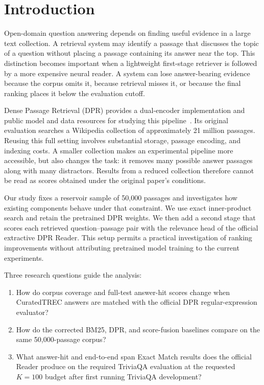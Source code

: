 \section{Introduction}
Open-domain question answering depends on finding useful evidence in a large text collection. A retrieval system may identify a passage that discusses the topic of a question without placing a passage containing its answer near the top. This distinction becomes important when a lightweight first-stage retriever is followed by a more expensive neural reader. A system can lose answer-bearing evidence because the corpus omits it, because retrieval misses it, or because the final ranking places it below the evaluation cutoff.

Dense Passage Retrieval (DPR) provides a dual-encoder implementation and public model and data resources for studying this pipeline~\cite{dpr,dprcode}. Its original evaluation searches a Wikipedia collection of approximately 21 million passages. Reusing this full setting involves substantial storage, passage encoding, and indexing costs. A smaller collection makes an experimental pipeline more accessible, but also changes the task: it removes many possible answer passages along with many distractors. Results from a reduced collection therefore cannot be read as scores obtained under the original paper's conditions.

Our study fixes a reservoir sample of 50,000 passages and investigates how existing components behave under that constraint. We use exact inner-product search and retain the pretrained DPR weights. We then add a second stage that scores each retrieved question--passage pair with the relevance head of the official extractive DPR Reader. This setup permits a practical investigation of ranking improvements without attributing pretrained model training to the current experiments.

Three research questions guide the analysis:
\begin{enumerate}
\item How do corpus coverage and full-test answer-hit scores change when CuratedTREC answers are matched with the official DPR regular-expression evaluator?
\item How do the corrected BM25, DPR, and score-fusion baselines compare on the same 50,000-passage corpus?
\item What answer-hit and end-to-end span Exact Match results does the official Reader produce on the required TriviaQA evaluation at the requested $K=100$ budget after first running TriviaQA development?
\end{enumerate}


